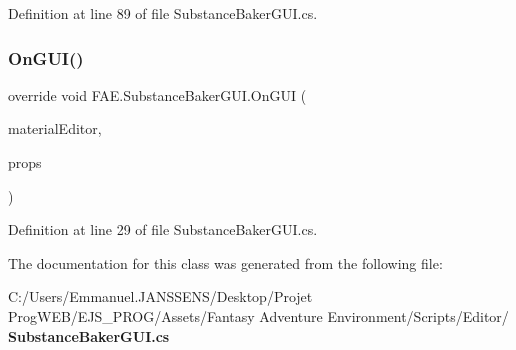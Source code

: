 Definition at line 89 of file Substance\+Baker\+G\+U\+I.\+cs.

\mbox{\label{class_f_a_e_1_1_substance_baker_g_u_i_a43c0b8de8b7ccd85b2fd9566669fbf1c}} 
\subsubsection{On\+G\+U\+I()}
{\footnotesize\ttfamily override void F\+A\+E.\+Substance\+Baker\+G\+U\+I.\+On\+G\+UI (\begin{DoxyParamCaption}\item[{Material\+Editor}]{material\+Editor,  }\item[{Material\+Property [$\,$]}]{props }\end{DoxyParamCaption})}



Definition at line 29 of file Substance\+Baker\+G\+U\+I.\+cs.



The documentation for this class was generated from the following file\+:\begin{DoxyCompactItemize}
\item 
C\+:/\+Users/\+Emmanuel.\+J\+A\+N\+S\+S\+E\+N\+S/\+Desktop/\+Projet Prog\+W\+E\+B/\+E\+J\+S\+\_\+\+P\+R\+O\+G/\+Assets/\+Fantasy Adventure Environment/\+Scripts/\+Editor/\textbf{ Substance\+Baker\+G\+U\+I.\+cs}\end{DoxyCompactItemize}
